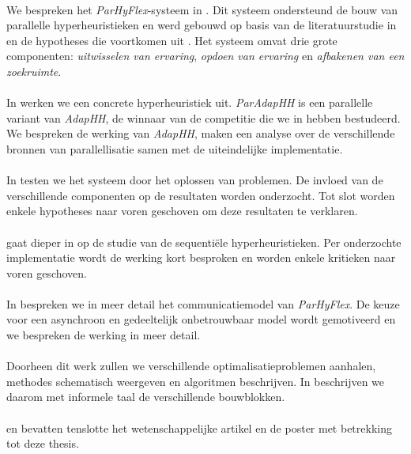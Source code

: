 \paragraph{}
We bespreken het \emph{ParHyFlex}-systeem in . Dit systeem ondersteund de bouw van parallelle hyperheuristieken en werd gebouwd op basis van de literatuurstudie in  en de hypotheses die voortkomen uit . Het systeem omvat drie grote componenten: \emph{uitwisselen van ervaring}, \emph{opdoen van ervaring} en \emph{afbakenen van een zoekruimte}.

\paragraph{}
In  werken we een concrete hyperheuristiek uit. \emph{ParAdapHH} is een parallelle variant van \emph{AdapHH}, de winnaar van de competitie die we in  hebben bestudeerd. We bespreken de werking van \emph{AdapHH}, maken een analyse over de verschillende bronnen van parallellisatie samen met de uiteindelijke implementatie.

\paragraph{}
In  testen we het systeem door het oplossen van  problemen. De invloed van de verschillende componenten op de resultaten worden onderzocht. Tot slot worden enkele hypotheses naar voren geschoven om deze resultaten te verklaren.

\paragraph{}
 gaat dieper in op de studie van de sequenti\"ele hyperheuristieken. Per onderzochte implementatie wordt de werking kort besproken en worden enkele kritieken naar voren geschoven.

\paragraph{}
In  bespreken we in meer detail het communicatiemodel van \emph{ParHyFlex}. De keuze voor een asynchroon en gedeeltelijk onbetrouwbaar model wordt gemotiveerd en we bespreken de werking in meer detail.

\paragraph{}
Doorheen dit werk zullen we verschillende optimalisatieproblemen aanhalen, methodes schematisch weergeven en algoritmen beschrijven. In  beschrijven we daarom met informele taal de verschillende bouwblokken.

\paragraph{}
 en  bevatten tenslotte het wetenschappelijke artikel en de poster met betrekking tot deze thesis.



